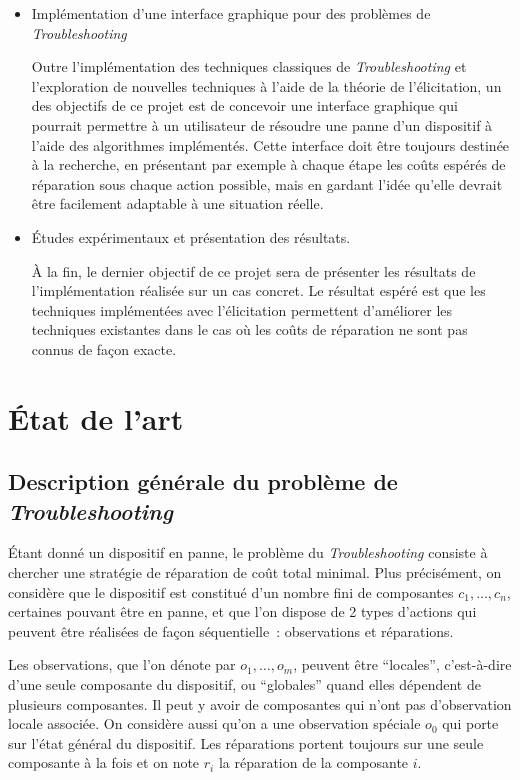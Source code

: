 \documentclass[a4paper,11pt]{article}
\theoremstyle{plain}
\theoremstyle{definition}
\begin{document}
\begin{itemize}
\item Implémentation d'une interface graphique pour des problèmes de \emph{Troubleshooting}

Outre l'implémentation des techniques classiques de \emph{Troubleshooting} et l'exploration de nouvelles techniques à l'aide de la théorie de l'élicitation, un des objectifs de ce projet est de concevoir une interface graphique qui pourrait permettre à un utilisateur de résoudre une panne d'un dispositif à l'aide des algorithmes implémentés. Cette interface doit être toujours destinée à la recherche, en présentant par exemple à chaque étape les coûts espérés de réparation sous chaque action possible, mais en gardant l'idée qu'elle devrait être facilement adaptable à une situation réelle.

\item Études expérimentaux et présentation des résultats.

À la fin, le dernier objectif de ce projet sera de présenter les résultats de l'implémentation réalisée sur un cas concret.  Le résultat espéré est que les techniques implémentées avec l'élicitation permettent d'améliorer les techniques existantes dans le cas où les coûts de réparation ne sont pas connus de façon exacte.

\end{itemize}

\section{État de l'art}
\label{SecEtatDeLArt}

\subsection{Description générale du problème de \emph{Troubleshooting}}
\label{SecDescription}

Étant donné un dispositif en panne, le problème du \emph{Troubleshooting} consiste à chercher une stratégie de réparation de coût total minimal. Plus précisément, on considère que le dispositif est constitué d'un nombre fini de composantes $c_1, \dotsc, c_n$, certaines pouvant être en panne, et que l'on dispose de 2 types d'actions qui peuvent être réalisées de façon séquentielle~: observations et réparations.

Les observations, que l'on dénote par $o_1, \dotsc, o_m$,  peuvent être ``locales'', c'est-à-dire d'une seule composante du dispositif, ou ``globales'' quand elles dépendent de plusieurs composantes. Il peut y avoir de composantes qui n'ont pas d'observation locale associée. On considère aussi qu'on a une observation spéciale $o_0$ qui porte sur l'état général du dispositif. Les réparations portent toujours sur une seule composante à la fois et on note $r_i$ la réparation de la composante $i$. 
\end{document}
